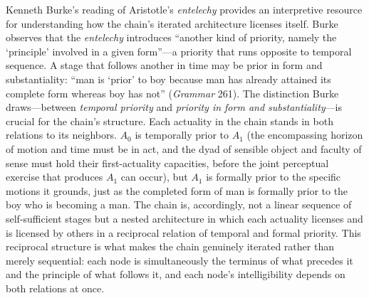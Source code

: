 \documentclass{article}
\begin{document}
Kenneth Burke's reading of Aristotle's \textit{entelechy} provides an interpretive resource for understanding how the chain's iterated architecture licenses itself. Burke observes that the \textit{entelechy} introduces ``another kind of priority, namely the `principle' involved in a given form''---a priority that runs opposite to temporal sequence. A stage that follows another in time may be prior in form and substantiality: ``man is `prior' to boy because man has already attained its complete form whereas boy has not'' (\textit{Grammar} 261). The distinction Burke draws---between \textit{temporal priority} and \textit{priority in form and substantiality}---is crucial for the chain's structure. Each actuality in the chain stands in both relations to its neighbors. $A_0$ is temporally prior to $A_1$ (the encompassing horizon of motion and time must be in act, and the dyad of sensible object and faculty of sense must hold their first-actuality capacities, before the joint perceptual exercise that produces $A_1$ can occur), but $A_1$ is formally prior to the specific motions it grounds, just as the completed form of man is formally prior to the boy who is becoming a man. The chain is, accordingly, not a linear sequence of self-sufficient stages but a nested architecture in which each actuality licenses and is licensed by others in a reciprocal relation of temporal and formal priority. This reciprocal structure is what makes the chain genuinely iterated rather than merely sequential: each node is simultaneously the terminus of what precedes it and the principle of what follows it, and each node's intelligibility depends on both relations at once.
\end{document}
